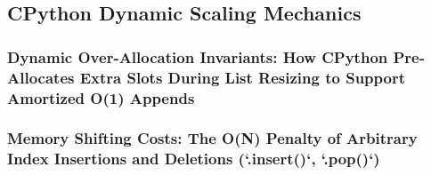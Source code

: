 \subsection{CPython Dynamic Scaling Mechanics}
\subsubsection{Dynamic Over-Allocation Invariants: How CPython Pre-Allocates Extra Slots During List Resizing to Support Amortized O(1) Appends}
\subsubsection{Memory Shifting Costs: The O(N) Penalty of Arbitrary Index Insertions and Deletions (`.insert()`, `.pop()`)}
